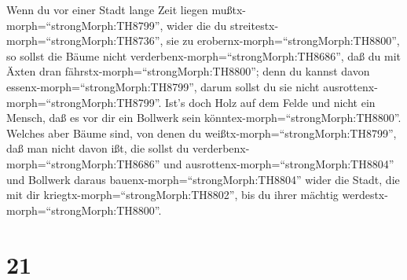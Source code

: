  Wenn du vor einer Stadt lange Zeit liegen
mußtx-morph=``strongMorph:TH8799'', wider die du
streitestx-morph=``strongMorph:TH8736'', sie zu
erobernx-morph=``strongMorph:TH8800'', so sollst die Bäume nicht
verderbenx-morph=``strongMorph:TH8686'', daß du mit Äxten dran
fährstx-morph=``strongMorph:TH8800''; denn du kannst davon
essenx-morph=``strongMorph:TH8799'', darum sollst du sie nicht
ausrottenx-morph=``strongMorph:TH8799''. Ist's doch Holz auf dem Felde
und nicht ein Mensch, daß es vor dir ein Bollwerk sein
könntex-morph=``strongMorph:TH8800''.  Welches aber Bäume
sind, von denen du weißtx-morph=``strongMorph:TH8799'', daß man nicht
davon ißt, die sollst du verderbenx-morph=``strongMorph:TH8686'' und
ausrottenx-morph=``strongMorph:TH8804'' und Bollwerk daraus
bauenx-morph=``strongMorph:TH8804'' wider die Stadt, die mit dir
kriegtx-morph=``strongMorph:TH8802'', bis du ihrer mächtig
werdestx-morph=``strongMorph:TH8800''.

\hypertarget{section-20}{%
\section{21}\label{section-20}}

